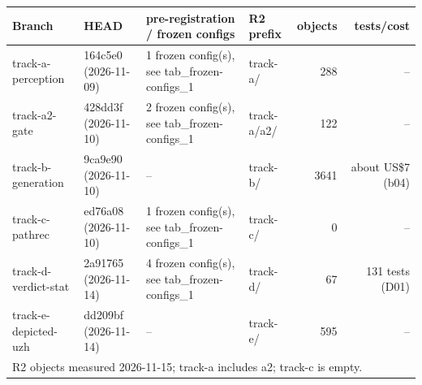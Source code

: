 \footnotesize
\begin{tabular}{llllrr}
\toprule
Branch & HEAD & pre-registration / frozen configs & R2 prefix & objects & tests/cost \\
\midrule
track-a-perception & 164c5e0 (2026-11-09) & 1 frozen config(s), see tab\_frozen-configs\_1 & track-a/ & 288 & -- \\
track-a2-gate & 428dd3f (2026-11-10) & 2 frozen config(s), see tab\_frozen-configs\_1 & track-a/a2/ & 122 & -- \\
track-b-generation & 9ca9e90 (2026-11-10) & -- & track-b/ & 3641 & about US\$7 (b04) \\
track-c-pathrec & ed76a08 (2026-11-10) & 1 frozen config(s), see tab\_frozen-configs\_1 & track-c/ & 0 & -- \\
track-d-verdict-stat & 2a91765 (2026-11-14) & 4 frozen config(s), see tab\_frozen-configs\_1 & track-d/ & 67 & 131 tests (D01) \\
track-e-depicted-uzh & dd209bf (2026-11-14) & -- & track-e/ & 595 & -- \\
\bottomrule
\multicolumn{6}{l}{\footnotesize R2 objects measured 2026-11-15; track-a includes a2; track-c is empty.} \\
\end{tabular}
